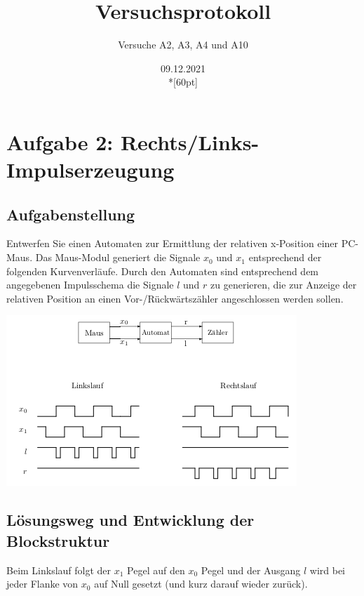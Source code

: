 \documentclass[a4paper,12pt,titlepage]{scrartcl}
\begin{document}
\titlehead
{
    \small
    {
        Technische Universität Ilmenau\\
        Fakulät IA\\
        Fachgebiet Schaltsysteme\\

        Praktikum Schaltsysteme\\
        WS 2021/22}
}

\title {Versuchsprotokoll}
\subtitle{Versuche A2, A3, A4 und A10}
\author{}
\date{09.12.2021\\*[60pt]}
\maketitle

\pagestyle{fancy}
\newpage

\section*{Aufgabe 2: Rechts/Links-Impulserzeugung}
\subsection*{Aufgabenstellung}
Entwerfen Sie einen Automaten zur Ermittlung der relativen x-Position einer PC-Maus.
Das Maus-Modul generiert die Signale $x_0$ und $x_1$ entsprechend der folgenden Kurvenverläufe.
Durch den Automaten sind entsprechend dem angegebenen Impulsschema die Signale $l$ und $r$ zu generieren, die zur Anzeige der relativen Position an einen Vor-/Rückwärtszähler angeschlossen werden sollen.

\begin{center}
    \includegraphics[width=.5\linewidth]{Assets/Schaltsysteme-praktika-v2.png}
\end{center}

\subsection*{Lösungsweg und Entwicklung der Blockstruktur}
Beim Linkslauf folgt der $x_1$ Pegel auf den $x_0$ Pegel und der Ausgang $l$ wird bei jeder Flanke von $x_0$ auf Null gesetzt (und kurz darauf wieder zurück).
\end{document}
